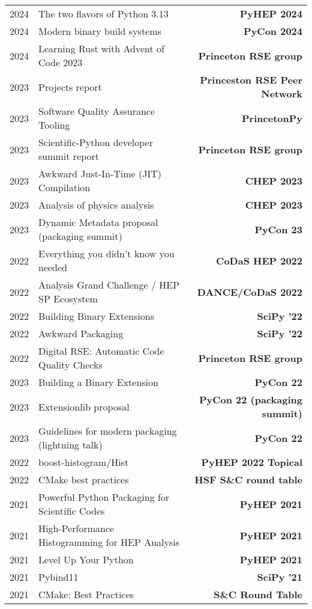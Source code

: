 \documentclass[10pt,letterpaper]{moderncv}
\begin{document}

\begin{tabularx}{\textwidth}{p{.33in}X>{\bfseries}r}
    2024 & The two flavors of Python 3.13 & PyHEP 2024 \\
    2024 & Modern binary build systems & PyCon 2024 \\
    2024 & Learning Rust with Advent of Code 2023 & Princeton RSE group \\
    2023 & Projects report & Princeston RSE Peer Network \\
    2023 & Software Quality Assurance Tooling & PrincetonPy \\
    2023 & Scientific-Python developer summit report & Princeton RSE group \\
    2023 & Awkward Just-In-Time (JIT) Compilation & CHEP 2023 \\
    2023 & Analysis of physics analysis & CHEP 2023 \\
    2023 & Dynamic Metadata proposal (packaging summit) & PyCon 23 \\
    2022 & Everything you didn't know you needed & CoDaS HEP 2022 \\
    2022 & Analysis Grand Challenge / HEP SP Ecosystem & DANCE/CoDaS 2022 \\
    2022 & Building Binary Extensions & SciPy '22 \\
    2022 & Awkward Packaging & SciPy '22 \\
    2022 & Digital RSE: Automatic Code Quality Checks & Princeton RSE group \\
    2023 & Building a Binary Extension & PyCon 22 \\
    2023 & Extensionlib proposal & PyCon 22 (packaging summit) \\
    2023 & Guidelines for modern packaging (lightning talk) & PyCon 22 \\
    2022 & boost-histogram/Hist & PyHEP 2022 Topical \\
    2022 & CMake best practices & HSF S\&C round table \\
	2021 & Powerful Python Packaging for Scientific Codes & PyHEP 2021 \\
	2021 & High-Performance Histogramming for HEP Analysis & PyHEP 2021 \\
	2021 & Level Up Your Python & PyHEP 2021 \\
	2021 & Pybind11 & SciPy '21 \\
    2021 & CMake: Best Practices & S\&C Round Table \\

\end{tabularx}
\end{document}
